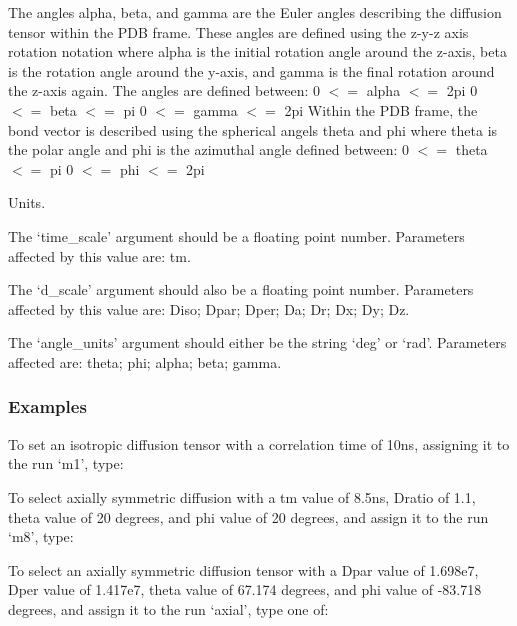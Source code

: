 The angles alpha, beta, and gamma are the Euler angles describing the diffusion tensor
within the PDB frame.  These angles are defined using the z-y-z axis rotation notation where
alpha is the initial rotation angle around the z-axis, beta is the rotation angle around the
y-axis, and gamma is the final rotation around the z-axis again.  The angles are defined
between:
    0 $<=$ alpha $<=$ 2pi
    0 $<=$ beta $<=$ pi
    0 $<=$ gamma $<=$ 2pi
Within the PDB frame, the bond vector is described using the spherical angels theta and phi
where theta is the polar angle and phi is the azimuthal angle defined between:
    0 $<=$ theta $<=$ pi
    0 $<=$ phi $<=$ 2pi


Units.

The `time\_scale' argument should be a floating point number.  Parameters affected by this
value are:  tm.

The `d\_scale' argument should also be a floating point number.  Parameters affected by this
value are:  Diso; Dpar; Dper; Da; Dr; Dx; Dy; Dz.

The `angle\_units' argument should either be the string `deg' or `rad'.  Parameters affected
are:  theta; phi; alpha; beta; gamma.



\subsubsection{Examples}

To set an isotropic diffusion tensor with a correlation time of 10ns, assigning it to the
run `m1', type:



To select axially symmetric diffusion with a tm value of 8.5ns, Dratio of 1.1, theta value
of 20 degrees, and phi value of 20 degrees, and assign it to the run `m8', type:


To select an axially symmetric diffusion tensor with a Dpar value of 1.698e7, Dper value of
1.417e7, theta value of 67.174 degrees, and phi value of -83.718 degrees, and assign it to
the run `axial', type one of:


